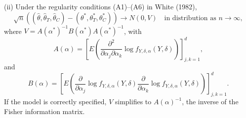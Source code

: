 (ii) Under the regularity conditions (A1)–(A6) in White (1982)\cite{5805f73c-4dfa-385e-bd6d-68424fb9f5be},
\[
\sqrt{n} \left((\hat{\theta}, \hat{\theta}_T, \hat{\theta}_C) - (\theta^*, \theta_T^*, \theta_C^*)\right) \to N(0, V) \quad \text{in distribution as } n \to \infty,
\]
where \(V = A(\alpha^*)^{-1} B(\alpha^*) A(\alpha^*)^{-1}\), with
\[
A(\alpha) = \left[ E \left( \frac{\partial^2}{\partial \alpha_j \partial \alpha_k} \log f_{Y, \delta, \alpha}(Y, \delta) \right) \right]_{j,k=1}^d,
\]
and
\[
B(\alpha) = \left[ E \left( \frac{\partial}{\partial \alpha_j} \log f_{Y, \delta, \alpha}(Y, \delta) \frac{\partial}{\partial \alpha_k} \log f_{Y, \delta, \alpha}(Y, \delta) \right) \right]_{j,k=1}^d.
\]
If the model is correctly specified, \(V\) simplifies to \(A(\alpha)^{-1}\), the inverse of the Fisher information matrix.